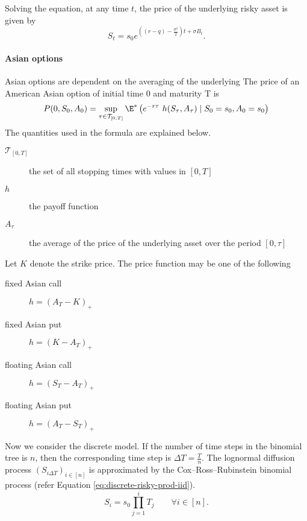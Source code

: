 Solving the equation, at any time $ t $, the price of the underlying risky asset is given by
\begin{equation*}
\label{eq:clq-risky-prc}
S_t = s_0 e^{ ( (r - q) - \frac{\sigma^2}{2} )t + \sigma B_t }.
\end{equation*}


\paragraph{Asian options}
Asian options are dependent on the averaging of the underlying
The price of an American Asian option of initial time 0 and maturity T is
\begin{equation}
	P(0, S_0, A_0) = \sup_{\tau \in \mathcal{T}_{[0,T]}}  \E^* \left(  e^{-r \tau} \  h(S_{\tau}, A_{\tau})  \mid  S_0 = s_0, A_0 = s_0  \right) 
\end{equation}
The quantities used in the formula are explained below.
\begin{description}
	\item[$ \mathcal{T}_{[0,T]} $] the set of all stopping times with values in $ [0, T ] $
	\item[$ h $] the payoff function
	\item[$ A_\tau $] the average of the price of the underlying asset over the period $ [0, \tau] $
\end{description}

Let $ K $ denote the strike price. The price function may be one of the following
\begin{description}
	\item[fixed Asian call] $ h = (A_T - K)_+ $
	\item[fixed Asian put] $ h = (K - A_T)_+ $
	\item[floating Asian call] $ h = (S_T - A_T)_+ $
	\item[floating Asian put] $ h = (A_T - S_T)_+ $
\end{description}

Now we consider the discrete model. If the number of time steps in the binomial tree is $ n $, then the corresponding time step is $ \Delta T = \frac{T}{n} $. The lognormal diffusion process $ (S_{i \Delta T})_{i \in [n]} $ is approximated by the Cox–Ross–Rubinstein binomial process (refer Equation \ref{eq:discrete-risky-prod-iid}).
\begin{equation*}
	S_i = s_0 \prod_{j=1}^{i} T_j  \qquad  \forall i \in [n] .
\end{equation*}

